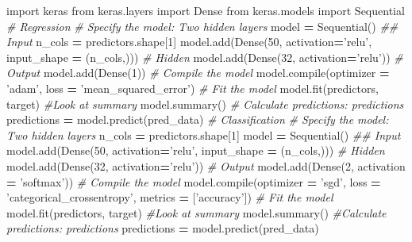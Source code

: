 \documentclass[]{book}
\newenvironment{Shaded}{\begin{snugshade}}{\end{snugshade}}
\newcommand{\DecValTok}[1]{\textcolor[rgb]{0.00,0.00,0.81}{#1}}
\newcommand{\StringTok}[1]{\textcolor[rgb]{0.31,0.60,0.02}{#1}}
\newcommand{\ImportTok}[1]{#1}
\newcommand{\CommentTok}[1]{\textcolor[rgb]{0.56,0.35,0.01}{\textit{#1}}}
\newcommand{\OperatorTok}[1]{\textcolor[rgb]{0.81,0.36,0.00}{\textbf{#1}}}
\newcommand{\BuiltInTok}[1]{#1}
\newcommand{\NormalTok}[1]{#1}
\begin{document}
\begin{Shaded}
\begin{Highlighting}[]
\ImportTok{import}\NormalTok{ keras}
\ImportTok{from}\NormalTok{ keras.layers }\ImportTok{import}\NormalTok{ Dense}
\ImportTok{from}\NormalTok{ keras.models }\ImportTok{import}\NormalTok{ Sequential}
\CommentTok{# Regression}
\CommentTok{# Specify the model: Two hidden layers}
\NormalTok{model }\OperatorTok{=}\NormalTok{ Sequential()}
\CommentTok{## Input}
\NormalTok{n_cols }\OperatorTok{=}\NormalTok{ predictors.shape[}\DecValTok{1}\NormalTok{]}
\NormalTok{model.add(Dense(}\DecValTok{50}\NormalTok{, activation}\OperatorTok{=}\StringTok{'relu'}\NormalTok{, input_shape }\OperatorTok{=}\NormalTok{ (n_cols,)))}
\CommentTok{# Hidden}
\NormalTok{model.add(Dense(}\DecValTok{32}\NormalTok{, activation}\OperatorTok{=}\StringTok{'relu'}\NormalTok{))}
\CommentTok{# Output}
\NormalTok{model.add(Dense(}\DecValTok{1}\NormalTok{))}
\CommentTok{# Compile the model}
\NormalTok{model.}\BuiltInTok{compile}\NormalTok{(optimizer }\OperatorTok{=} \StringTok{'adam'}\NormalTok{, loss }\OperatorTok{=} \StringTok{'mean_squared_error'}\NormalTok{) }
\CommentTok{# Fit the model}
\NormalTok{model.fit(predictors, target)}
\CommentTok{#Look at summary}
\NormalTok{model.summary()}
\CommentTok{# Calculate predictions: predictions}
\NormalTok{predictions }\OperatorTok{=}\NormalTok{ model.predict(pred_data)}
\CommentTok{# Classification}
\CommentTok{# Specify the model: Two hidden layers}
\NormalTok{n_cols }\OperatorTok{=}\NormalTok{ predictors.shape[}\DecValTok{1}\NormalTok{]}
\NormalTok{model }\OperatorTok{=}\NormalTok{ Sequential()}
\CommentTok{## Input}
\NormalTok{model.add(Dense(}\DecValTok{50}\NormalTok{, activation}\OperatorTok{=}\StringTok{'relu'}\NormalTok{, input_shape }\OperatorTok{=}\NormalTok{ (n_cols,)))}
\CommentTok{# Hidden}
\NormalTok{model.add(Dense(}\DecValTok{32}\NormalTok{, activation}\OperatorTok{=}\StringTok{'relu'}\NormalTok{))}
\CommentTok{# Output}
\NormalTok{model.add(Dense(}\DecValTok{2}\NormalTok{, activation }\OperatorTok{=} \StringTok{'softmax'}\NormalTok{))}
\CommentTok{# Compile the model}
\NormalTok{model.}\BuiltInTok{compile}\NormalTok{(optimizer }\OperatorTok{=} \StringTok{'sgd'}\NormalTok{, loss }\OperatorTok{=} \StringTok{'categorical_crossentropy'}\NormalTok{, metrics }\OperatorTok{=}\NormalTok{ [}\StringTok{'accuracy'}\NormalTok{])}
\CommentTok{# Fit the model}
\NormalTok{model.fit(predictors, target)}
\CommentTok{#Look at summary}
\NormalTok{model.summary()}
\CommentTok{#Calculate predictions: predictions}
\NormalTok{predictions }\OperatorTok{=}\NormalTok{ model.predict(pred_data)}

\end{Highlighting}
\end{Shaded}
\end{document}
